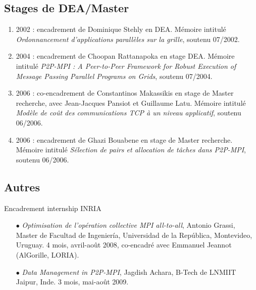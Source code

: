 \subsection{Stages de DEA/Master}
\begin{enumerate}
\item 2002 : encadrement de Dominique Stehly en DEA. Mémoire intitulé \textit{Ordonnancement d'applications parallèles sur la grille}, soutenu 07/2002.

\item 2004 : encadrement de Choopan Rattanapoka en stage DEA. Mémoire intitulé  \textit{P2P-MPI : A Peer-to-Peer Framework for Robust Execution of Message Passing Parallel Programs on Grids}, soutenu 07/2004.

\item 2006 : co-encadrement de Constantinos Makassikis en stage de Master recherche, avec Jean-Jacques Pansiot et Guillaume Latu. Mémoire intitulé  \textit{Modèle de coût des communications TCP à un niveau applicatif}, soutenu 06/2006.

\item 2006 : encadrement de Ghazi Bouabene en stage de Master recherche. Mémoire intitulé  \textit{Sélection de pairs et allocation de tâches dans P2P-MPI}, soutenu 06/2006.

\end{enumerate}


\subsection{Autres}
Encadrement internship INRIA\\
\begin{itemize}
\item[$\bullet$]  {\it Optimisation de l'opération collective MPI all-to-all}, Antonio Grassi, Master de Facultad de Ingeniería, Universidad de la República, Montevideo, Uruguay. 4 mois, avril-août 2008, co-encadré avec Emmanuel Jeannot (AlGorille, LORIA).
\item[$\bullet$]  {\it Data Management in P2P-MPI}, Jagdish Achara, B-Tech de LNMIIT Jaipur, Inde. 3 mois, mai-août 2009. 
\end{itemize}
~\\
 
